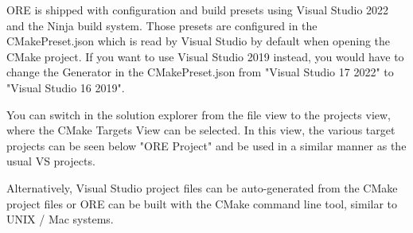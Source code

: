 ORE is shipped with configuration and build presets using Visual Studio 2022 and the Ninja build system. Those presets are configured in the CMakePreset.json which is read by Visual Studio by default when opening the CMake project. If you want to use Visual Studio 2019 instead, you would have to change the Generator in the CMakePreset.json from "Visual Studio 17 2022" to "Visual Studio 16 2019".

You can switch in the solution explorer from the file view to the projects view, where the CMake Targets View can be selected. In this view, the various target projects can be seen below "ORE Project" and be used in a similar manner as the usual VS projects.

\medskip

Alternatively, Visual Studio project files can be auto-generated from the CMake project files or ORE can be built with the CMake command line tool, similar to UNIX / Mac systems.


